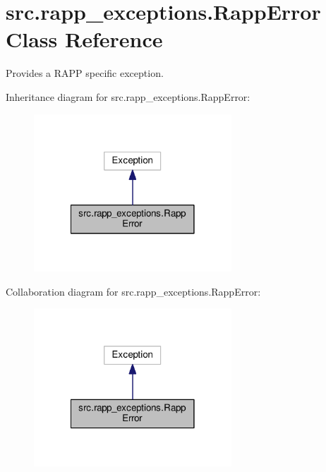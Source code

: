 \hypertarget{classsrc_1_1rapp__exceptions_1_1RappError}{\section{src.\-rapp\-\_\-exceptions.\-Rapp\-Error Class Reference}
\label{classsrc_1_1rapp__exceptions_1_1RappError}
}


Provides a R\-A\-P\-P specific exception.  




Inheritance diagram for src.\-rapp\-\_\-exceptions.\-Rapp\-Error\-:
\nopagebreak
\begin{figure}[H]
\begin{center}
\leavevmode
\includegraphics[width=210pt]{classsrc_1_1rapp__exceptions_1_1RappError__inherit__graph}
\end{center}
\end{figure}


Collaboration diagram for src.\-rapp\-\_\-exceptions.\-Rapp\-Error\-:
\nopagebreak
\begin{figure}[H]
\begin{center}
\leavevmode
\includegraphics[width=210pt]{classsrc_1_1rapp__exceptions_1_1RappError__coll__graph}
\end{center}
\end{figure}
